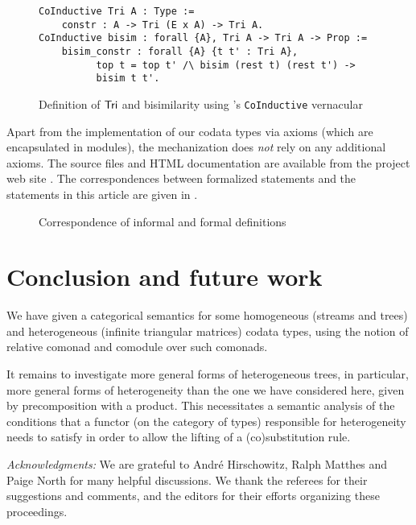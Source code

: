 \documentclass[a4paper,USenglish]{lipics}
\newcommand{\parencite}[1]{\cite{#1}}
\begin{document}
\begin{figure}
  \begin{lstlisting}
CoInductive Tri A : Type :=
    constr : A -> Tri (E x A) -> Tri A.
CoInductive bisim : forall {A}, Tri A -> Tri A -> Prop :=
    bisim_constr : forall {A} {t t' : Tri A}, 
          top t = top t' /\ bisim (rest t) (rest t') -> 
          bisim t t'.
\end{lstlisting}
 \caption{Definition of $\mathsf{Tri}$ and bisimilarity using \coq's \lstinline!CoInductive! vernacular} \label{tri_coinductive}
\end{figure}


Apart from the implementation of our codata types via axioms (which are encapsulated in modules), the mechanization does \emph{not} rely on any additional axioms.
The \coq source files and HTML documentation are available from the project web site \parencite{trimat_coq}.
The correspondences between formalized statements and the statements in this article are given in .



\begin{figure}[hbt]
 \begin{mdframed}
  
 \end{mdframed}
 \caption{Correspondence of informal and formal definitions} \label{sec:table_formal_informal}
\end{figure}


\section{Conclusion and future work}

We have given a categorical semantics for some homogeneous (streams and trees) and heterogeneous (infinite triangular matrices) codata types,
using the notion of relative comonad and comodule over such comonads.

It remains to investigate more general forms of heterogeneous trees, in particular, more general forms of heterogeneity than the one we have
considered here, given by precomposition with a product.
This necessitates a semantic analysis of the conditions that a functor (on the category of types) responsible for heterogeneity needs to satisfy in order to allow the lifting of a (co)substitution rule.

 \textit{Acknowledgments:}
 We are grateful to André Hirschowitz, Ralph Matthes and Paige North for many helpful discussions.
 We thank the referees for their suggestions and comments, and the editors for their efforts organizing these proceedings.
 


\end{document}
